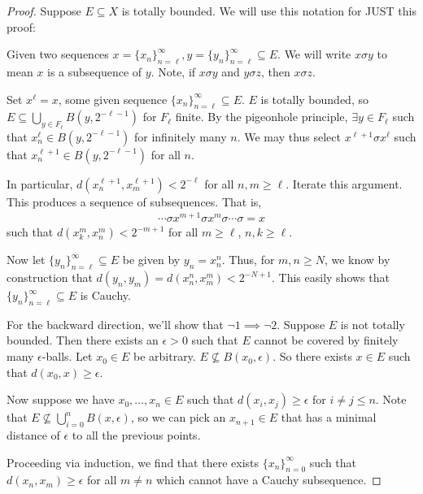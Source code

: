 \documentclass{report}
\begin{document}
\begin{proof}
    Suppose $E \subseteq X$ is totally bounded. We will use this notation for JUST this proof:

    \noindent Given two sequences $x = \{x_n\}_{n = \ell}^\infty, y = \{y_n\}_{n = \ell}^\infty \subseteq E$. We will write $x \sigma y$ to mean $x$ is a subsequence of $y$. Note, if $x \sigma y$ and $y \sigma z$, then $ x \sigma z$. 

    Set $x^\ell = x$, some given sequence $\{x_n\}_{n = \ell}^\infty \subseteq E$. $E$ is totally bounded, so $E \subseteq \bigcup_{y \in F_\ell} B(y, 2^{-\ell - 1})$ for $F_\ell$ finite. By the pigeonhole principle, $\exists y \in F_\ell$ such that $x^\ell_n \in B(y, 2^{-\ell - 1})$ for infinitely many $n$. We may thus select $x^{\ell + 1} \sigma x^{\ell}$ such that $x^{\ell + 1}_n \in B(y, 2^{-\ell - 1})$ for all $n$. 

    In particular, $d(x_{n}^{\ell + 1}, x_m^{\ell + 1}) < 2^{-\ell}$ for all $n,m \geq \ell$. Iterate this argument. This produces a sequence of subsequences. That is,
    \begin{align*}
        \cdots \sigma x^{m + 1} \sigma x^m \sigma \cdots \sigma = x
    \end{align*}
    such that $d(x^m_k, x^m_n) < 2^{-m +1}$ for all $m \geq \ell$, $n,k \geq \ell$. 

    Now let $\{y_n\}_{n = \ell}^\infty \subseteq E$ be given by $y_n = x^n_n$. Thus, for $m,n \geq N$, we know by construction that $d(y_n, y_m) = d(x_n^n , x^m_m) < 2^{-N + 1}$. This easily shows that $\{y_n\}_{n = \ell}^\infty \subseteq E$ is Cauchy.

    For the backward direction, we'll show that $\neg 1 \implies \neg 2$. Suppose $E$ is not totally bounded. Then there exists an $\epsilon > 0$ such that $E$ cannot be covered by finitely many $\epsilon$-balls. Let $x_0 \in E$ be arbitrary. $E \not\subseteq B(x_0, \epsilon)$. So there exists $x \in E$ such that $d(x_0, x) \geq \epsilon$. 

    Now suppose we have $x_0, \ldots, x_n \in E$ such that $d(x_i, x_j) \geq \epsilon$ for $i \neq j \leq n$. Note that $E \not\subseteq \bigcup_{i=0}^n B(x, \epsilon)$, so we can pick an $x_{n+1} \in E$ that has a minimal distance of $\epsilon$ to all the previous points. 

    Proceeding via induction, we find that there exists $\{x_n \}_{n= 0}^\infty$ such that $d(x_n, x_m) \geq \epsilon$ for all $m \neq n$ which cannot have a Cauchy subsequence. 
\end{proof}
\end{document}
